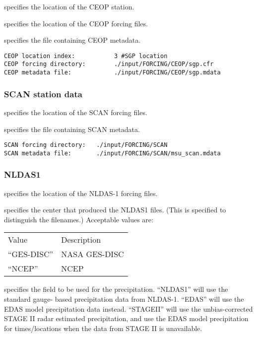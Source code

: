  
  specifies the location of the
 CEOP station.

  specifies the location of the
 CEOP forcing files.

  specifies the file containing
 CEOP metadata.
 

 \begin{Verbatim}[frame=single]
CEOP location index:           3 #SGP location
CEOP forcing directory:        ./input/FORCING/CEOP/sgp.cfr
CEOP metadata file:            ./input/FORCING/CEOP/sgp.mdata
 \end{Verbatim}

 
 \subsubsection{SCAN station data} \label{sssec:supp_scan}
 

 
  specifies the location of the
 SCAN forcing files.

  specifies the file containing
 SCAN metadata.
 

 \begin{Verbatim}[frame=single]
SCAN forcing directory:   ./input/FORCING/SCAN
SCAN metadata file:       ./input/FORCING/SCAN/msu_scan.mdata
 \end{Verbatim}

 
 \subsubsection{NLDAS1} \label{sssec:forcings_nldas1}
 

 
  specifies the location of the
 NLDAS-1 forcing files.

  specifies the center that produced
 the NLDAS1 files. (This is specified to distinguish the filenames.) 
 Acceptable values are:

 \begin{tabular}{ll}
 Value & Description   \\
 ``GES-DISC'' & NASA GES-DISC \\
 ``NCEP''     & NCEP          \\
 \end{tabular}

  specifies the field to be used
 for the precipitation.  ``NLDAS1'' will use the standard gauge-
 based precipitation data from NLDAS-1.  ``EDAS'' will use the
 EDAS model precipitation data instead.  ``STAGEII'' will use the
 unbias-corrected STAGE II radar estimated precipitation, and use
 the EDAS model precipitation for times/locations when the data
 from STAGE II is unavailable.

